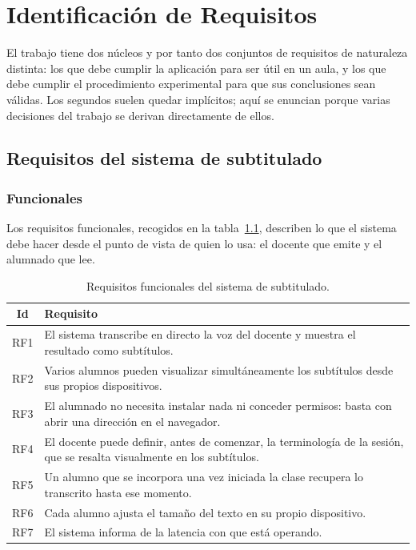 \chapter{Identificación de Requisitos}
\label{cap:requisitos}

El trabajo tiene dos núcleos y por tanto dos conjuntos de requisitos de naturaleza
distinta: los que debe cumplir la aplicación para ser útil en un aula, y los que debe
cumplir el procedimiento experimental para que sus conclusiones sean válidas. Los segundos
suelen quedar implícitos; aquí se enuncian porque varias decisiones del trabajo se derivan
directamente de ellos.

\section{Requisitos del sistema de subtitulado}

\subsection{Funcionales}

Los requisitos funcionales, recogidos en la tabla~\ref{tab:rf}, describen lo que el sistema
debe hacer desde el punto de vista de quien lo usa: el docente que emite y el alumnado que
lee.

\begin{table}[h]
\centering
\small
\begin{tabular}{|c|p{11cm}|}
\hline
\textbf{Id} & \textbf{Requisito} \\
\hline
RF1 & El sistema transcribe en directo la voz del docente y muestra el resultado como
      subtítulos. \\
\hline
RF2 & Varios alumnos pueden visualizar simultáneamente los subtítulos desde sus propios
      dispositivos. \\
\hline
RF3 & El alumnado no necesita instalar nada ni conceder permisos: basta con abrir una
      dirección en el navegador. \\
\hline
RF4 & El docente puede definir, antes de comenzar, la terminología de la sesión, que se
      resalta visualmente en los subtítulos. \\
\hline
RF5 & Un alumno que se incorpora una vez iniciada la clase recupera lo transcrito hasta
      ese momento. \\
\hline
RF6 & Cada alumno ajusta el tamaño del texto en su propio dispositivo. \\
\hline
RF7 & El sistema informa de la latencia con que está operando. \\
\hline
\end{tabular}
\caption{Requisitos funcionales del sistema de subtitulado.}
\label{tab:rf}
\end{table}

